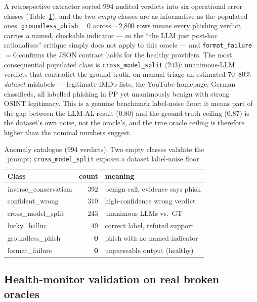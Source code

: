 A retrospective extractor sorted $994$ audited verdicts into six operational
error classes (Table~\ref{tab:bench-anom}), and the two \emph{empty} classes are
as informative as the populated ones. \texttt{groundless\_phish}$=0$ across
$\sim$2{,}800 rows means every phishing verdict carries a named, checkable
indicator --- so the ``the LLM just post-hoc rationalises'' critique simply does
not apply to this oracle --- and \texttt{format\_failure}$=0$ confirms the JSON
contract holds for the healthy providers. The most consequential populated class
is \texttt{cross\_model\_split} ($243$): unanimous-LLM verdicts that contradict
the ground truth, on manual triage an estimated $70$--$80\%$ \emph{dataset}
mislabels --- legitimate IMDb lists, the YouTube homepage, German classifieds, all
labelled phishing in PP yet unanimously benign with strong OSINT legitimacy. This
is a genuine benchmark label-noise floor: it means part of the gap between the
LLM-AL result ($0.80$) and the ground-truth ceiling ($0.87$) is the dataset's own
noise, not the oracle's, and the true oracle ceiling is therefore higher than the
nominal numbers suggest.

\begin{table}[h]
\centering
\caption{Anomaly catalogue ($994$ verdicts). Two empty classes validate the
prompt; \texttt{cross\_model\_split} exposes a dataset label-noise floor.}
\label{tab:bench-anom}
\small
\begin{tabular}{@{}lrl@{}}
\toprule
Class & count & meaning \\
\midrule
inverse\_conservatism & 392 & benign call, evidence says phish \\
confident\_wrong      & 310 & high-confidence wrong verdict \\
cross\_model\_split   & 243 & unanimous LLMs vs.\ GT \\
lucky\_halluc         & 49  & correct label, refuted support \\
groundless\_phish     & \textbf{0} & phish with no named indicator \\
format\_failure       & \textbf{0} & unparseable output (healthy) \\
\bottomrule
\end{tabular}
\end{table}

\subsection{Health-monitor validation on real broken oracles}
\label{app:bench-llama}

